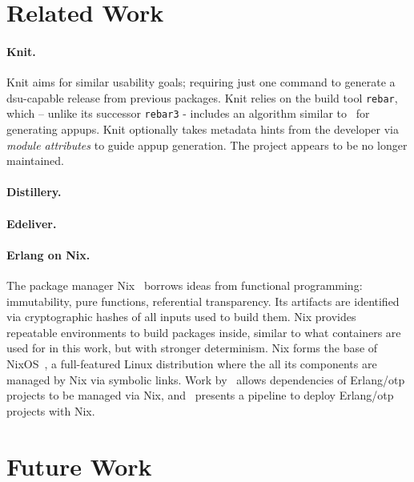 \cleardoublepage
\section{Related Work}\label{sec:related_work}

\paragraph{Knit.}\cite{davis:knit,davis:talk} Knit aims for similar usability goals; requiring just one command to generate a \acrshort{dsu}-capable release from previous packages. Knit relies on the build tool \lstinline|rebar|, which – unlike its successor \lstinline|rebar3| - includes an algorithm similar to~\cite{rebar3appup} for generating \acrshort{appup}s. Knit optionally takes metadata hints from the developer via \emph{module attributes} to guide \acrshort{appup} generation. The project appears to be no longer maintained.

\paragraph{Distillery.}

\paragraph{Edeliver.}

\paragraph{Erlang on Nix.} The package manager Nix~\cite{nix1} borrows ideas from functional programming: immutability, pure functions, referential transparency. Its artifacts are identified via cryptographic hashes of all inputs used to build them. Nix provides repeatable environments to build packages inside, similar to what containers are used for in this work, but with stronger determinism. Nix forms the base of NixOS~\cite{nixos}, a full-featured Linux distribution where the all its components are managed by Nix via symbolic links.
Work by~\cite{erlangnix} allows dependencies of Erlang/\acrshort{otp} projects to be managed via Nix, and \cite{erlangnix2}~presents a pipeline to deploy Erlang/\acrshort{otp} projects with Nix.

\cleardoublepage
\section{Future Work}

